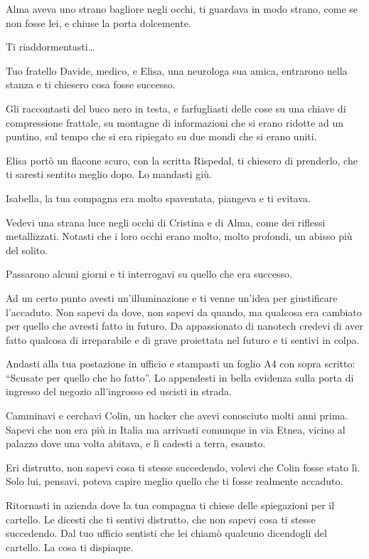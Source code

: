 Alma aveva uno strano bagliore negli occhi, ti guardava in modo strano, come se non fosse lei, e chiuse la porta dolcemente.

Ti riaddormentasti\ldots

Tuo fratello Davide, medico, e Elisa, una neurologa sua amica, entrarono nella stanza e ti chiesero cosa fosse successo.

Gli raccontasti del buco nero in testa, e farfugliasti delle cose su una chiave di compressione frattale, su montagne di informazioni che si erano ridotte ad un puntino, sul tempo che si era ripiegato su due mondi che si erano uniti.

Elisa portò un flacone scuro, con la scritta Rispedal, ti chiesero di prenderlo, che ti saresti sentito meglio dopo. Lo mandasti giù.

Isabella, la tua compagna era molto spaventata, piangeva e ti evitava.

Vedevi una strana luce negli occhi di Cristina e di Alma, come dei riflessi metallizzati. Notasti che i loro occhi erano molto, molto profondi, un abisso più del solito.

Passarono alcuni giorni e ti interrogavi su quello che era successo.

Ad un certo punto avesti un'illuminazione e ti venne un'idea per giustificare l'accaduto. Non sapevi da dove, non sapevi da quando, ma qualcosa era cambiato per quello che avresti fatto in futuro. Da appassionato di nanotech credevi di aver fatto qualcosa di irreparabile e di grave proiettata nel futuro e ti sentivi in colpa.

Andasti alla tua postazione in ufficio e stampasti un foglio A4 con sopra scritto: “Scusate per quello che ho fatto”. Lo appendesti in bella evidenza sulla porta di ingresso del negozio all'ingrosso ed uscisti in strada.

Camminavi e cerchavi Colin, un hacker che avevi conosciuto molti anni prima. Sapevi che non era più in Italia ma arrivasti comunque in via Etnea, vicino al palazzo dove una volta abitava, e lì cadesti a terra, esausto.

Eri distrutto, non sapevi cosa ti stesse succedendo, volevi che Colin fosse stato lì. Solo lui, pensavi, poteva capire meglio quello che ti fosse realmente accaduto.

Ritornasti in azienda dove la tua compagna ti chiese delle spiegazioni per il cartello. Le dicesti che ti sentivi distrutto, che non sapevi cosa ti stesse succedendo. Dal tuo ufficio sentisti che lei chiamò qualcuno dicendogli del cartello. La cosa ti dispiaque.

